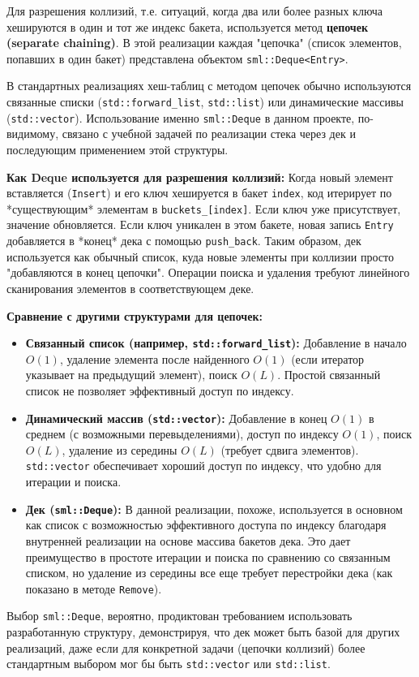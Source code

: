 \documentclass[a4paper,12pt]{article}
\begin{document}
Для разрешения коллизий, т.е. ситуаций, когда два или более разных ключа хешируются в один и тот же индекс бакета, используется метод \textbf{цепочек (separate chaining)}. В этой реализации каждая "цепочка" (список элементов, попавших в один бакет) представлена объектом \texttt{sml::Deque<Entry>}.

В стандартных реализациях хеш-таблиц с методом цепочек обычно используются связанные списки (\texttt{std::forward\_list}, \texttt{std::list}) или динамические массивы (\texttt{std::vector}). Использование именно \texttt{sml::Deque} в данном проекте, по-видимому, связано с учебной задачей по реализации стека через дек и последующим применением этой структуры.

\textbf{Как Deque используется для разрешения коллизий:}
Когда новый элемент вставляется (\texttt{Insert}) и его ключ хешируется в бакет \texttt{index}, код итерирует по *существующим* элементам в \texttt{buckets\_[index]}. Если ключ уже присутствует, значение обновляется. Если ключ уникален в этом бакете, новая запись \texttt{Entry} добавляется в *конец* дека с помощью \texttt{push\_back}. Таким образом, дек используется как обычный список, куда новые элементы при коллизии просто "добавляются в конец цепочки". Операции поиска и удаления требуют линейного сканирования элементов в соответствующем деке.

\textbf{Сравнение с другими структурами для цепочек:}
\begin{itemize}
    \item \textbf{Связанный список (например, \texttt{std::forward\_list}):} Добавление в начало \(O(1)\), удаление элемента после найденного \(O(1)\) (если итератор указывает на предыдущий элемент), поиск \(O(L)\). Простой связанный список не позволяет эффективный доступ по индексу.
    \item \textbf{Динамический массив (\texttt{std::vector}):} Добавление в конец \(O(1)\) в среднем (с возможными перевыделениями), доступ по индексу \(O(1)\), поиск \(O(L)\), удаление из середины \(O(L)\) (требует сдвига элементов). \texttt{std::vector} обеспечивает хороший доступ по индексу, что удобно для итерации и поиска.
    \item \textbf{Дек (\texttt{sml::Deque}):} В данной реализации, похоже, используется в основном как список с возможностью эффективного доступа по индексу благодаря внутренней реализации на основе массива бакетов дека. Это дает преимущество в простоте итерации и поиска по сравнению со связанным списком, но удаление из середины все еще требует перестройки дека (как показано в методе \texttt{Remove}).
\end{itemize}
Выбор \texttt{sml::Deque}, вероятно, продиктован требованием использовать разработанную структуру, демонстрируя, что дек может быть базой для других реализаций, даже если для конкретной задачи (цепочки коллизий) более стандартным выбором мог бы быть \texttt{std::vector} или \texttt{std::list}.
\end{document}
